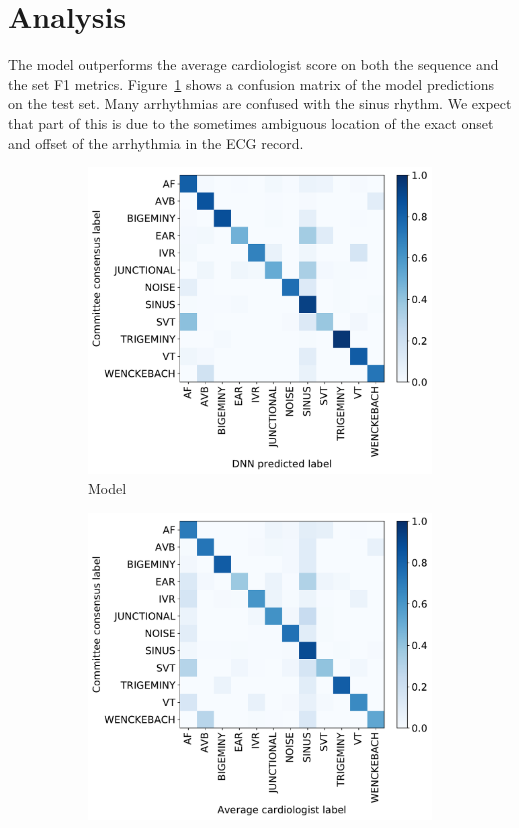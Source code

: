 \section{Analysis}

The model outperforms the average cardiologist score on both the sequence and
the set F1 metrics. Figure~\ref{fig:arrhythmia:model_confusion} shows a
confusion matrix of the model predictions on the test set. Many arrhythmias are
confused with the sinus rhythm. We expect that part of this is due to the
sometimes ambiguous location of the exact onset and offset of the arrhythmia in
the ECG record.

\begin{figure}
\begin{subfigure}{.5\textwidth}
  \centering
  \includegraphics[width=0.9\linewidth]{arrhythmias/figures/model_confusions.pdf}
  \caption{Model}
  \label{fig:arrhythmia:model_confusion}
\end{subfigure}
\begin{subfigure}{.5\textwidth}
  \centering
  \includegraphics[width=0.9\linewidth]{arrhythmias/figures/human_confusions.pdf}

\end{subfigure}
\end{figure}
